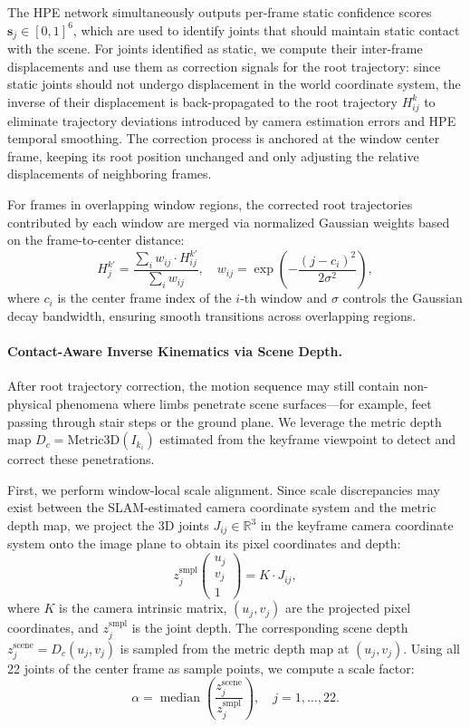 \documentclass[runningheads]{llncs}
\begin{document}
The HPE network simultaneously outputs per-frame static confidence scores $\mathbf{s}_j \in [0,1]^6$, which are used to identify joints that should maintain static contact with the scene. For joints identified as static, we compute their inter-frame displacements and use them as correction signals for the root trajectory: since static joints should not undergo displacement in the world coordinate system, the inverse of their displacement is back-propagated to the root trajectory $H_{ij}^{k}$ to eliminate trajectory deviations introduced by camera estimation errors and HPE temporal smoothing. The correction process is anchored at the window center frame, keeping its root position unchanged and only adjusting the relative displacements of neighboring frames.

For frames in overlapping window regions, the corrected root trajectories contributed by each window are merged via normalized Gaussian weights based on the frame-to-center distance:
%
\begin{equation}
  H_{j}^{k'} = \frac{\sum_{i} w_{ij} \cdot H_{ij}^{k'}}{\sum_{i} w_{ij}}, \quad w_{ij} = \exp\!\left(-\frac{(j - c_i)^2}{2\sigma^2}\right),
\end{equation}
%
where $c_i$ is the center frame index of the $i$-th window and $\sigma$ controls the Gaussian decay bandwidth, ensuring smooth transitions across overlapping regions.

\paragraph{Contact-Aware Inverse Kinematics via Scene Depth.}
After root trajectory correction, the motion sequence may still contain non-physical phenomena where limbs penetrate scene surfaces---for example, feet passing through stair steps or the ground plane. We leverage the metric depth map $D_c = \text{Metric3D}(I_{k_i})$ estimated from the keyframe viewpoint to detect and correct these penetrations.

First, we perform window-local scale alignment. Since scale discrepancies may exist between the SLAM-estimated camera coordinate system and the metric depth map, we project the 3D joints $J_{ij} \in \mathbb{R}^3$ in the keyframe camera coordinate system onto the image plane to obtain its pixel coordinates and depth:
%
\begin{equation}
  z_j^{\text{smpl}} \begin{pmatrix} u_j \\ v_j \\ 1 \end{pmatrix} = K \cdot J_{ij},
\end{equation}
%
where $K$ is the camera intrinsic matrix, $(u_j, v_j)$ are the projected pixel coordinates, and $z_j^{\text{smpl}}$ is the joint depth. The corresponding scene depth $z_j^{\text{scene}} = D_c(u_j, v_j)$ is sampled from the metric depth map at $(u_j, v_j)$. Using all 22 joints of the center frame as sample points, we compute a scale factor:
%
\begin{equation}
  \alpha = \operatorname{median}\!\left(\frac{z_j^{\text{scene}}}{z_j^{\text{smpl}}}\right), \quad j = 1, \ldots, 22.
\end{equation}
\end{document}
